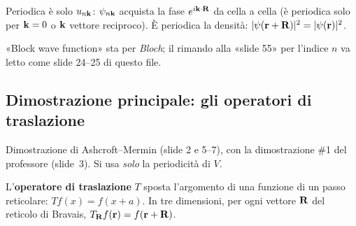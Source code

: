 \documentclass[11pt,a4paper]{article}
\begin{document}
\begin{osservazione}
Periodica è solo $u_{n\mathbf k}$: $\psi_{n\mathbf k}$ acquista la fase $e^{i\mathbf k\cdot\mathbf R}$ da cella a cella (è periodica solo per $\mathbf k=0$ o $\mathbf k$ vettore
reciproco). È periodica la densità: $|\psi(\mathbf r+\mathbf R)|^2=|\psi(\mathbf r)|^2$.
\end{osservazione}

\begin{osservazione}
«Block wave function» sta per \emph{Bloch}; il rimando alla «slide 55» per l'indice $n$ va letto come slide 24--25 di questo file.
\end{osservazione}

\subsection{Dimostrazione principale: gli operatori di traslazione}\label{sec:dimbloch}
Dimostrazione di Ashcroft--Mermin (slide 2 e 5--7), con la dimostrazione \#1 del professore (slide~3). Si usa \emph{solo} la periodicità di $V$.
\begin{definizione}
L'\textbf{operatore di traslazione}  $T$ sposta l'argomento di una funzione di un passo reticolare: $Tf(x)=f(x+a)$. In
tre dimensioni, per ogni vettore $\mathbf R$ del reticolo di Bravais, $T_{\mathbf R}f(\mathbf r)=f(\mathbf r+\mathbf R)$.
\end{definizione}
\end{document}
